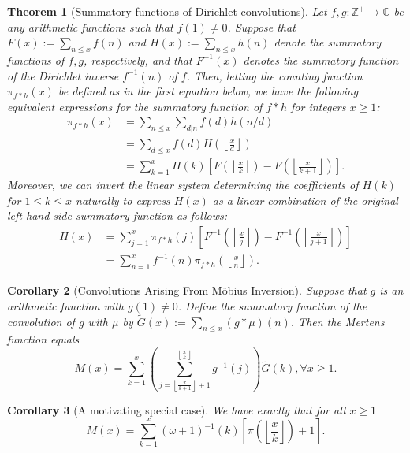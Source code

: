 \documentclass[11pt,reqno,a4letter]{article}
\numberwithin{figure}{section}
\numberwithin{table}{section}
\newcommand{\floor}[1]{\left\lfloor #1 \right\rfloor}
\newcommand{\Floor}[2]{\ensuremath{\left\lfloor \frac{#1}{#2} \right\rfloor}}
\theoremstyle{plain}
\newtheorem{theorem}{Theorem}
\newtheorem{cor}[theorem]{Corollary}
\numberwithin{theorem}{section}
\theoremstyle{definition}
\begin{document}
\begin{theorem}[Summatory functions of Dirichlet convolutions] 
\label{theorem_SummatoryFuncsOfDirCvls} 
Let $f,g: \mathbb{Z}^{+} \rightarrow \mathbb{C}$ be any arithmetic functions such that $f(1) \neq 0$. 
Suppose that $F(x) := \sum_{n \leq x} f(n)$ and $H(x) := \sum_{n \leq x} h(n)$ denote the summatory 
functions of $f,g$, respectively, and that $F^{-1}(x)$ denotes the summatory function of the 
Dirichlet inverse $f^{-1}(n)$ of $f$. Then, letting the counting function $\pi_{f \ast h}(x)$ be defined 
as in the first equation below, we have the following equivalent expressions for the 
summatory function of $f \ast h$ for integers $x \geq 1$: 
\begin{align*} 
\pi_{f \ast h}(x) & = \sum_{n \leq x} \sum_{d|n} f(d) h(n/d) \\ 
     & = \sum_{d \leq x} f(d) H\left(\Floor{x}{d}\right) \\ 
     & = \sum_{k=1}^{x} H(k) \left[F\left(\Floor{x}{k}\right) - 
     F\left(\Floor{x}{k+1}\right)\right]. 
\end{align*} 
Moreover, we can invert the linear system determining the coefficients of $H(k)$ for $1 \leq k \leq x$ 
naturally to express $H(x)$ as a linear combination of the original left-hand-side 
summatory function as follows:
\begin{align*} 
H(x) & = \sum_{j=1}^{x} \pi_{f \ast h}(j) \left[F^{-1}\left(\Floor{x}{j}\right) - 
     F^{-1}\left(\Floor{x}{j+1}\right)\right] \\ 
     & = \sum_{n=1}^{x} f^{-1}(n) \pi_{f \ast h}\left(\Floor{x}{n}\right). 
\end{align*} 
\end{theorem} 

\begin{cor}[Convolutions Arising From M\"obius Inversion] 
\label{cor_CvlGAstMu} 
Suppose that $g$ is an arithmetic function with $g(1) \neq 0$. Define the summatory function of 
the convolution of $g$ with $\mu$ by $\widetilde{G}(x) := \sum_{n \leq x} (g \ast \mu)(n)$. 
Then the Mertens function equals 
\[
M(x) = \sum_{k=1}^{x} \left(\sum_{j=\floor{\frac{x}{k+1}}+1}^{\floor{\frac{x}{k}}} g^{-1}(j)\right) 
     \widetilde{G}(k), \forall x \geq 1. 
\]
\end{cor} 

\begin{cor}[A motivating special case] 
\label{cor_Mx_gInvnPixk_formula} 
We have exactly that for all $x \geq 1$ 
\begin{equation} 
\label{eqn_Mx_gInvnPixk_formula} 
M(x) = \sum_{k=1}^{x} (\omega+1)^{-1}(k) \left[\pi\left(\Floor{x}{k}\right) + 1\right]. 
\end{equation} 
\end{cor} 
\end{document}
